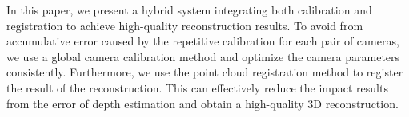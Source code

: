 In this paper, we present a hybrid system integrating both calibration and registration to achieve high-quality reconstruction results. To avoid from accumulative error caused by the repetitive calibration for each pair of cameras, we use a global camera calibration method and optimize the camera parameters consistently. Furthermore, we use the point cloud registration method to register the result of the reconstruction. This can effectively reduce the impact results from the error of depth estimation and obtain a high-quality 3D reconstruction.






